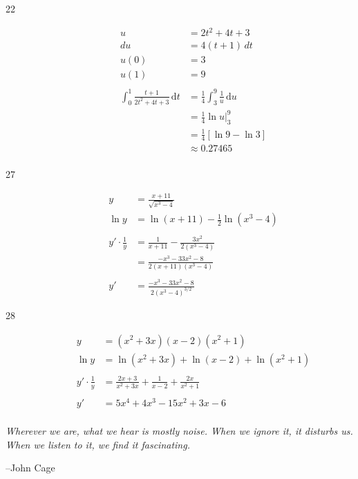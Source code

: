 \documentclass{exam}
\begin{document}
\begin{description}
\item[22]
\begin{align*}
  u &= 2t^2 + 4t + 3 \\
  du &= 4(t + 1) \, dt \\
  u(0) &= 3 \\
  u(1) &= 9 \\
\\
  \int_0^1 \frac{t + 1}{2t^2 + 4t + 3} \, \mathrm{d}t &= \frac{1}{4} \int_3^9 \frac{1}{u} \, \mathrm{d}u \\
  &= \frac{1}{4} \ln u \bigg|_3^9 \\
  &= \frac{1}{4} [ \ln 9 - \ln 3 ] \\
  &\approx 0.27465 \\
\end{align*}

\item[27]
\begin{align*}
  y &= \frac{x + 11}{\sqrt{x^3 - 4}} \\
  \ln y &= \ln(x + 11) - \frac{1}{2} \ln(x^3 - 4) \\
\\
  y' \cdot \frac{1}{y} &= \frac{1}{x + 11} - \frac{3x^2}{2(x^3 - 4)} \\
  &= \frac{-x^3 - 33x^2 - 8}{2(x + 11)(x^3 - 4)} \\
\\
  y' &= \frac{-x^3 - 33x^2 - 8}{2(x^3 - 4)^{3/2}}
\end{align*}

\item[28]
\begin{align*}
  y &= (x^2 + 3x)(x-2)(x^2+1) \\
  \ln y &= \ln(x^2 + 3x) + \ln(x-2) + \ln(x^2 + 1) \\
\\
  y' \cdot \frac{1}{y} &= \frac{2x + 3}{x^2 + 3x} + \frac{1}{x-2} + \frac{2x}{x^2 + 1} \\
\\
  y' &= 5x^4 + 4x^3 - 15x^2 + 3x - 6 \\
\end{align*}

\end{description}

\else

\vspace{8 cm}
{\em Wherever we are, what we hear is mostly noise. When we ignore it, it disturbs us.  When we listen to it, we find it fascinating.}

\hspace{0.5 cm} --John Cage


\fi
\end{document}
